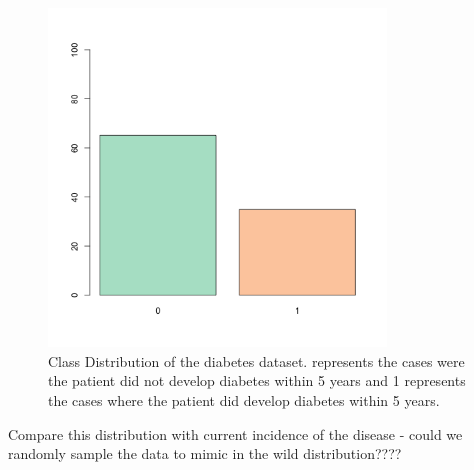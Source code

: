 \begin{figure}[H]
    \centering
    \includegraphics[width=0.8\textwidth]{ThesisTemplate/usingLatex/chapter4Images/figure4_8.png}
    \caption{Class Distribution of the diabetes dataset. represents the cases were the patient did not develop diabetes within 5 years and 1 represents the cases where the patient did develop diabetes within 5 years.}
    \label{fig:my_label}
\end{figure}

Compare this distribution with current incidence of the disease - could we randomly sample the data to mimic in the wild distribution????

